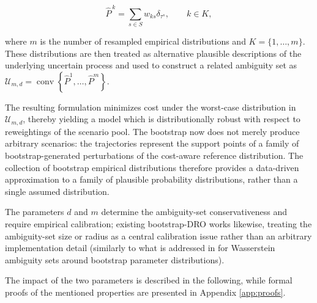 \documentclass[mnsc,sglanonrev]{informs4}  %
\theoremstyle{remark}\newtheorem{remark}{Remark}
\begin{document}
$$
\widehat P^{\,k} =\sum_{s\in S}w_{ks}\delta_{\tau^s}, \qquad k\in K,
$$

\noindent where $m$ is the number of resampled empirical distributions and $K = \{1,\ldots,m\}$. These distributions are then treated as alternative plausible descriptions of the underlying uncertain process and used to construct a related ambiguity set as
$ \mathcal U_{m,d} = \operatorname{conv}\left\{ \widehat P^1,\ldots,\widehat P^m \right\}. $

The resulting formulation minimizes cost under the worst-case distribution in \(\mathcal U_{m,d}\), thereby yielding a model which is distributionally robust with respect to reweightings of the scenario pool. The bootstrap now does not merely produce arbitrary scenarios: the trajectories represent the support points of a family of bootstrap-generated perturbations of the cost-aware reference distribution.
The collection of bootstrap empirical distributions therefore provides a data-driven approximation to a family of plausible probability distributions, rather than a single assumed distribution. 

The parameters $d$ and $m$ determine the ambiguity-set conservativeness and require empirical calibration; existing bootstrap-DRO works likewise, treating the ambiguity-set size or radius as a central calibration issue rather than an arbitrary implementation detail (similarly to what is addressed in \cite{SK21} for Wasserstein ambiguity sets around bootstrap parameter distributions). %

The impact of the two parameters is described in the following, while formal proofs of the mentioned properties are presented in Appendix \ref{app:proofs}. 

\end{document}
